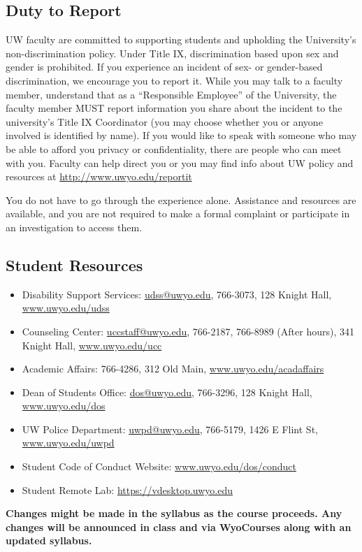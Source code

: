 \documentclass[11pt, letterpaper]{article}
\begin{document}
\subsection*{Duty to Report} UW faculty are committed to supporting students and upholding the University’s non-discrimination policy. Under Title IX, discrimination based upon sex and gender is prohibited. If you experience an incident of sex- or gender-based discrimination, we encourage you to report it. While you may talk to a faculty member, understand that as a “Responsible Employee” of the University, the faculty member MUST report information you share about the incident to the university’s Title IX Coordinator (you may choose whether you or anyone involved is identified by name). If you would like to speak with someone who may be able to afford you privacy or confidentiality, there are people who can meet with you. Faculty can help direct you or you may find info about UW policy and resources at \url{http://www.uwyo.edu/reportit}

You do not have to go through the experience alone. Assistance and resources are available, and you are not required to make a formal complaint or participate in an investigation to access them.

\subsection*{Student Resources}
\begin{itemize}[itemsep=0pt, topsep=0pt]
  \item Disability Support Services: \url{udss@uwyo.edu}, 766-3073, 128 Knight Hall, \url{www.uwyo.edu/udss}
  \item Counseling Center: \url{uccstaff@uwyo.edu}, 766-2187, 766-8989 (After hours), 341 Knight Hall, \url{www.uwyo.edu/ucc}
  \item Academic Affairs: 766-4286, 312 Old Main, \url{www.uwyo.edu/acadaffairs}
  \item Dean of Students Office: \url{dos@uwyo.edu}, 766-3296, 128 Knight Hall, \url{www.uwyo.edu/dos}
  \item UW Police Department: \url{uwpd@uwyo.edu}, 766-5179, 1426 E Flint St, \url{www.uwyo.edu/uwpd}
  \item Student Code of Conduct Website: \url{www.uwyo.edu/dos/conduct}
  \item Student Remote Lab: \url{https://vdesktop.uwyo.edu}
\end{itemize}

\vspace{-10pt}
\begin{center}
\textbf{Changes might be made in the syllabus as the course proceeds. Any changes will be announced in class and via WyoCourses along with an updated syllabus.}
\end{center}
\end{document}
